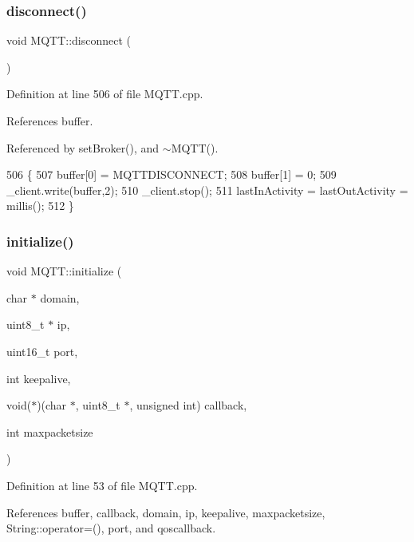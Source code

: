 \subsubsection{disconnect()}
{\footnotesize\ttfamily void M\+Q\+T\+T\+::disconnect (\begin{DoxyParamCaption}{ }\end{DoxyParamCaption})}



Definition at line 506 of file M\+Q\+T\+T.\+cpp.



References buffer.



Referenced by set\+Broker(), and $\sim$\+M\+Q\+T\+T().


\begin{DoxyCode}
506                       \{
507     buffer[0] = MQTTDISCONNECT;
508     buffer[1] = 0;
509     _client.write(buffer,2);
510     _client.stop();
511     lastInActivity = lastOutActivity = millis();
512 \}
\end{DoxyCode}
\mbox{\label{class_m_q_t_t_a849de76aa2a1f4b89c1b4a8dfb7c3661}} 
\subsubsection{initialize()}
{\footnotesize\ttfamily void M\+Q\+T\+T\+::initialize (\begin{DoxyParamCaption}\item[{char $\ast$}]{domain,  }\item[{uint8\+\_\+t $\ast$}]{ip,  }\item[{uint16\+\_\+t}]{port,  }\item[{int}]{keepalive,  }\item[{void($\ast$)(char $\ast$, uint8\+\_\+t $\ast$, unsigned int)}]{callback,  }\item[{int}]{maxpacketsize }\end{DoxyParamCaption})\hspace{0.3cm}{\ttfamily [private]}}



Definition at line 53 of file M\+Q\+T\+T.\+cpp.



References buffer, callback, domain, ip, keepalive, maxpacketsize, String\+::operator=(), port, and qoscallback.



